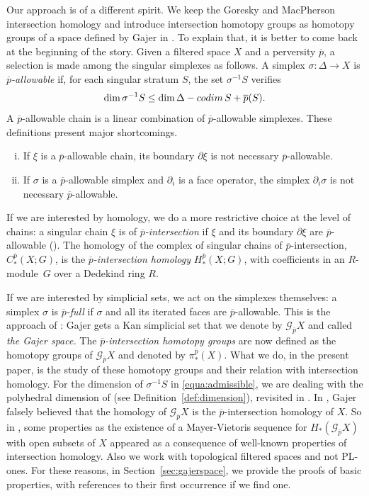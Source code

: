 \documentclass[a4paper,10pt,english,reqno]{amsart}
\theoremstyle{plain}
\theoremstyle{definition}
\theoremstyle{remark}
\numberwithin{equation}{section}
\newcommand{\secref}[1]{Section~\ref{#1}}
\newcommand{\defref}[1]{Definition~\ref{#1}}
\def\ov{\overline}
\def\crG{{\mathscr G}}
\def\codim{{\rm codim\,}}
\renewcommand\1{\hbox{\ding{192}}}
\renewcommand\2{\hbox{\ding{193}}}
\newcommand\3{\hbox{\ding{194}}}
\newcommand\4{\hbox{\ding{195}}}
\begin{document}
 \smallskip
Our approach is of a different spirit. We keep the Goresky and MacPherson intersection homology and
introduce intersection homotopy groups as homotopy groups of a space defined 
by Gajer in \cite{MR1404919,MR1489215}. 
%
To explain that, it is better to come back at the beginning of the story.
Given a filtered space $X$ and a perversity $\ov{p}$, a selection is made among the singular simplexes as follows.
A simplex $\sigma\colon \Delta\to X$ is  
\emph{$\ov{p}$-allowable}  
if, for each singular stratum $S$, the set $\sigma^{-1}S$ verifies
%
\begin{equation}\label{equa:admissible}
\dim \sigma^{-1}S\leq \dim\Delta-\codim S +\ov{p}(S).
%
\end{equation}
A $\ov{p}$-allowable chain is a linear combination of $\ov{p}$-allowable simplexes.
These definitions present major shortcomings. 
%
 \begin{enumerate}[i)]
%
 \item If $\xi$ is a $\ov{p}$-allowable chain, its boundary $\partial \xi$ is not necessary $\ov{p}$-allowable.
  \item If $\sigma$ is a $\ov{p}$-allowable simplex and $\partial_{i}$ is a face operator, 
 the simplex $\partial_{i}\sigma$ is not necessary $\ov{p}$-allowable.
 \end{enumerate}
 
 If we are interested by homology, we do a more restrictive choice at the level of chains: 
 a singular  chain $\xi$ is  of \emph{$\ov{p}$-intersection} 
 if $\xi$ and its boundary $\partial \xi$ are $\ov{p}$-allowable (\cite{GM1}).
The  homology of the complex of singular chains of $\ov{p}$-intersection, $C_{*}^{\ov{p}}(X;G)$,
is the \emph{$\ov{p}$-intersection homology}  $H_*^{\ov{p}}(X;G)$, with coefficients in an  $R$-module~$G$
 over a Dedekind ring $R$.

\smallskip
If we are interested by simplicial sets, 
we act on the simplexes themselves: a simplex $\sigma$ is \emph{$\ov{p}$-full} if $\sigma$ and all 
its iterated faces are $\ov{p}$-allowable. This is the approach of \cite{MR1404919}:
Gajer gets a  Kan simplicial set that we 
denote by $\crG_{\ov{p}}X$ and called \emph{the Gajer space.} 
The \emph{$\ov{p}$-intersection homotopy groups} are now defined as the homotopy groups of $\crG_{\ov{p}}X$
and denoted by $\pi^{\ov{p}}_{*}(X)$.
%
What we do, in the present paper, is the study of these homotopy groups and their relation with intersection homology. 
For the dimension of $\sigma^{-1}S$  in \eqref{equa:admissible},  we are dealing with the polyhedral dimension of \cite{MR1404919}
(see \defref{def:dimension}), revisited in \cite{CST8}.
%
%
In \cite{MR1404919}, Gajer falsely believed that the homology of $\crG_{\ov{p}}X$ is the
$\ov{p}$-intersection homology of $X$. 
So in \cite{MR1404919}, some properties as the existence of a Mayer-Vietoris sequence
for $H_{*}(\crG_{\ov{p}}X)$ with open subsets of $X$ appeared as a consequence of well-known properties of
intersection homology. 
Also we  work with topological filtered spaces and not PL-ones.
For these reasons, in \secref{sec:gajerspace},  we provide the proofs of basic properties, 
with  references to their first  occurrence if we find one.
\end{document}
